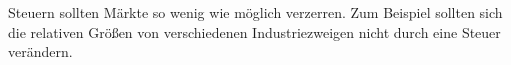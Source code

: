 Steuern sollten Märkte so wenig wie möglich verzerren.
Zum Beispiel sollten sich die relativen Größen von verschiedenen Industriezweigen nicht durch eine Steuer verändern.